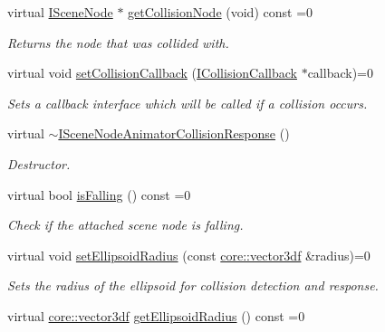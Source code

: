 \begin{DoxyCompactItemize}
virtual \hyperlink{classirr_1_1scene_1_1ISceneNode}{I\+Scene\+Node} $\ast$ \hyperlink{classirr_1_1scene_1_1ISceneNodeAnimatorCollisionResponse_a5a975ddf3d776d6bb4c6d44c36cc74fd}{get\+Collision\+Node} (void) const =0
\begin{DoxyCompactList}\small\item\em Returns the node that was collided with. \end{DoxyCompactList}\item 
virtual void \hyperlink{classirr_1_1scene_1_1ISceneNodeAnimatorCollisionResponse_a2b97f977b446200c5dd22230aec5d275}{set\+Collision\+Callback} (\hyperlink{classirr_1_1scene_1_1ICollisionCallback}{I\+Collision\+Callback} $\ast$callback)=0
\begin{DoxyCompactList}\small\item\em Sets a callback interface which will be called if a collision occurs. \end{DoxyCompactList}\item 
\mbox{\label{classirr_1_1scene_1_1ISceneNodeAnimatorCollisionResponse_ab6b85fb4f76e2d0c03cf2c6b326bddde}} 
virtual \hyperlink{classirr_1_1scene_1_1ISceneNodeAnimatorCollisionResponse_ab6b85fb4f76e2d0c03cf2c6b326bddde}{$\sim$\+I\+Scene\+Node\+Animator\+Collision\+Response} ()
\begin{DoxyCompactList}\small\item\em Destructor. \end{DoxyCompactList}\item 
virtual bool \hyperlink{classirr_1_1scene_1_1ISceneNodeAnimatorCollisionResponse_a66f5534c1d2ac0e2ea52e7b21a3c91d7}{is\+Falling} () const =0
\begin{DoxyCompactList}\small\item\em Check if the attached scene node is falling. \end{DoxyCompactList}\item 
virtual void \hyperlink{classirr_1_1scene_1_1ISceneNodeAnimatorCollisionResponse_a71af73590016ba936340a79467690d3f}{set\+Ellipsoid\+Radius} (const \hyperlink{namespaceirr_1_1core_ae6e2b2a6c552833ebbd5b7463d03586b}{core\+::vector3df} \&radius)=0
\begin{DoxyCompactList}\small\item\em Sets the radius of the ellipsoid for collision detection and response. \end{DoxyCompactList}\item 
virtual \hyperlink{namespaceirr_1_1core_ae6e2b2a6c552833ebbd5b7463d03586b}{core\+::vector3df} \hyperlink{classirr_1_1scene_1_1ISceneNodeAnimatorCollisionResponse_a92965919db3dfbaab2d1f4987a2c52c1}{get\+Ellipsoid\+Radius} () const =0

\end{DoxyCompactItemize}
